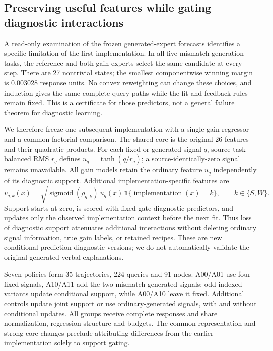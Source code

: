 \documentclass[10pt]{article}
\begin{document}
\subsection{Preserving useful features while gating diagnostic interactions}
A read-only examination of the frozen generated-expert forecasts identifies a specific limitation of the first implementation.
In all five mismatch-generation tasks, the reference and both gain experts select the same candidate at every step.
There are 27 nontrivial states; the smallest componentwise winning margin is 0.003028 response units.
No convex reweighting can change these choices, and induction gives the same complete query paths while the fit and feedback rules remain fixed.
This is a certificate for those predictors, not a general failure theorem for diagnostic learning.

We therefore freeze one subsequent implementation with a single gain regressor and a common factorial comparison.
The shared core is the original 26 features and their quadratic products.
For each fixed or generated signal $q$, source-task-balanced RMS $r_q$ defines $u_q=\tanh(q/r_q)$; a source-identically-zero signal remains unavailable.
All gain models retain the ordinary feature $u_q$ independently of its diagnostic support.
Additional implementation-specific features are
\[
 v_{q,k}(x)=\sqrt{\operatorname{sigmoid}(\rho_{q,k})}\,u_q(x)\,\mathbf 1\{\operatorname{implementation}(x)=k\},\qquad k\in\{S,W\}.
\]
Support starts at zero, is scored with fixed-gate diagnostic predictors, and updates only the observed implementation context before the next fit.
Thus loss of diagnostic support attenuates additional interactions without deleting ordinary signal information, true gain labels, or retained recipes.
These are new conditional-prediction diagnostic versions; we do not automatically validate the original generated verbal explanations.

Seven policies form 35 trajectories, 224 queries and 91 nodes.
A00/A01 use four fixed signals, A10/A11 add the two mismatch-generated signals; odd-indexed variants update conditional support, while A00/A10 leave it fixed.
Additional controls update joint support or use ordinary-generated signals, with and without conditional updates.
All groups receive complete responses and share normalization, regression structure and budgets.
The common representation and strong-core changes preclude attributing differences from the earlier implementation solely to support gating.
\end{document}
